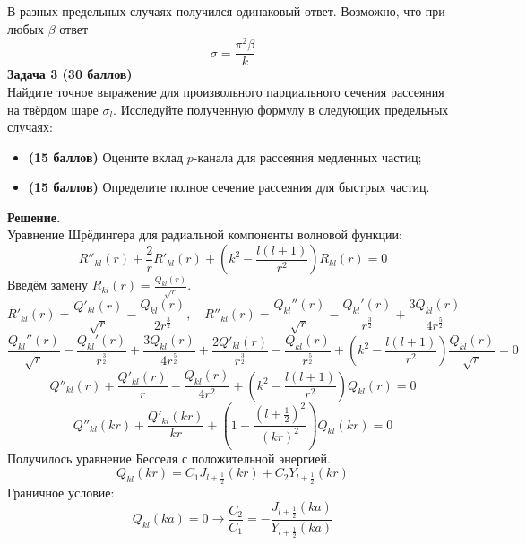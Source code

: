 \documentclass[12pt]{article}
\theoremstyle{definition}
\begin{document}
В разных предельных случаях получился одинаковый ответ. Возможно, что при любых $\beta$ ответ
\begin{equation}
    \boxed{\sigma=\frac{\pi^2\beta}{k}}
\end{equation}
\textbf{Задача 3 (30 баллов)}\\
Найдите точное выражение для произвольного парциального сечения рассеяния на твёрдом шаре $\sigma_l$. Исследуйте полученную формулу в следующих предельных случаях:
\begin{itemize}
    \item \textbf{(15 баллов)} Оцените вклад $p$-канала для рассеяния медленных частиц;
    \item \textbf{(15 баллов)} Определите полное сечение рассеяния для быстрых частиц.
\end{itemize}
\textbf{Решение.}\\
Уравнение Шрёдингера для радиальной компоненты волновой функции:
\begin{equation}
    R''_{kl}(r)+\frac{2}{r}R'_{kl}(r)+\left(k^2-\frac{l(l+1)}{r^2}\right)R_{kl}(r)=0
\end{equation}
Введём замену $R_{kl}(r)=\frac{Q_{kl}(r)}{\sqrt{r}}$.
\begin{equation}
    R'_{kl}(r)=\frac{Q'_{kl}(r)}{\sqrt{r}}-\frac{Q_{kl}(r)}{2r^\frac{3}{2}},\quad R''_{kl}(r)=\frac{Q_{kl}''(r)}{\sqrt{r}}-\frac{Q_{kl}'(r)}{r^\frac{3}{2}}+\frac{3Q_{kl}(r)}{4r^\frac{5}{2}}
\end{equation}
\begin{equation}
    \frac{Q_{kl}''(r)}{\sqrt{r}}-\frac{Q_{kl}'(r)}{r^\frac{3}{2}}+\frac{3Q_{kl}(r)}{4r^\frac{5}{2}}+\frac{2Q'_{kl}(r)}{r^\frac{3}{2}}-\frac{Q_{kl}(r)}{r^\frac{5}{2}}+\left(k^2-\frac{l(l+1)}{r^2}\right)\frac{Q_{kl}(r)}{\sqrt{r}}=0
\end{equation}
\begin{equation}
    Q''_{kl}(r)+\frac{Q'_{kl}(r)}{r}-\frac{Q_{kl}(r)}{4r^2}+\left(k^2-\frac{l(l+1)}{r^2}\right)Q_{kl}(r)=0
\end{equation}
\begin{equation}
    Q''_{kl}(kr)+\frac{Q'_{kl}(kr)}{kr}+\left(1-\frac{(l+\frac{1}{2})^2}{(kr)^2}\right)Q_{kl}(kr)=0
\end{equation}
Получилось уравнение Бесселя с положительной энергией.
\begin{equation}
    Q_{kl}(kr)=C_1J_{l+\frac{1}{2}}(kr)+C_2Y_{l+\frac{1}{2}}(kr)
\end{equation}
Граничное условие:
\begin{equation}
    Q_{kl}(ka)=0\rightarrow\frac{C_2}{C_1}=-\frac{J_{l+\frac{1}{2}}(ka)}{Y_{l+\frac{1}{2}}(ka)}
\end{equation}
\end{document}
